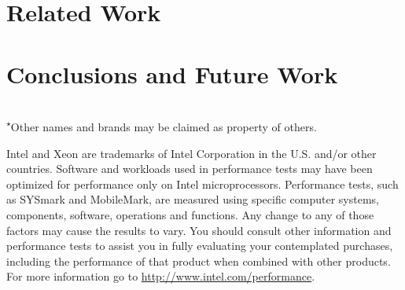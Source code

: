 \documentclass{llncs}
\newcommand{\othertm}{\textsuperscript{$\star$}}
\begin{document}
%

%

\section{Related Work}
\label{sec:related}

\section{Conclusions and Future Work}
\label{sec:conclusion}


\scriptsize{
    ~\\
    \noindent\othertm{}Other names and brands may be claimed as property of others.

    \noindent
    Intel and Xeon are trademarks of Intel Corporation in the U.S. and/or other countries.
    Software and workloads used in performance tests may have been optimized
    for performance only on Intel microprocessors.  Performance tests, such as
    SYSmark and MobileMark, are measured using specific computer systems,
    components, software, operations and functions.  Any change to any of those
    factors may cause the results to vary.  You should consult other information
    and performance tests to assist you in fully evaluating your contemplated
    purchases, including the performance of that product when combined with
    other products.  For more information go to \url{http://www.intel.com/performance}.
}

\small{


}
\end{document}
